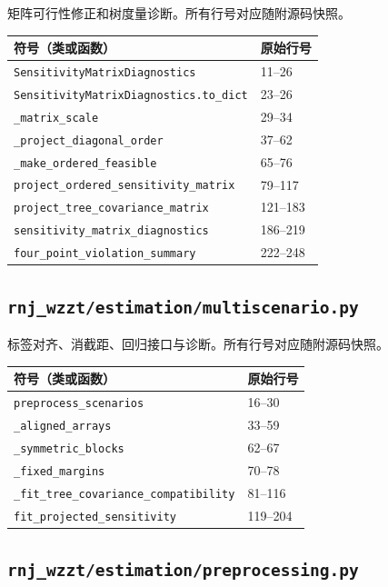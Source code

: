 矩阵可行性修正和树度量诊断。所有行号对应随附源码快照。
\begin{longtable}{P{0.73\textwidth}P{0.18\textwidth}}\toprule 符号（类或函数） & 原始行号\\\midrule\endhead
\nolinkurl{SensitivityMatrixDiagnostics} & 11--26 \\
\nolinkurl{SensitivityMatrixDiagnostics.to_dict} & 23--26 \\
\nolinkurl{_matrix_scale} & 29--34 \\
\nolinkurl{_project_diagonal_order} & 37--62 \\
\nolinkurl{_make_ordered_feasible} & 65--76 \\
\nolinkurl{project_ordered_sensitivity_matrix} & 79--117 \\
\nolinkurl{project_tree_covariance_matrix} & 121--183 \\
\nolinkurl{sensitivity_matrix_diagnostics} & 186--219 \\
\nolinkurl{four_point_violation_summary} & 222--248 \\
\bottomrule\end{longtable}
\subsection{\texorpdfstring{\nolinkurl{rnj_wzzt/estimation/multiscenario.py}}{rnj\_wzzt/estimation/multiscenario.py}}\label{module:estimation.multiscenario}
标签对齐、消截距、回归接口与诊断。所有行号对应随附源码快照。
\begin{longtable}{P{0.73\textwidth}P{0.18\textwidth}}\toprule 符号（类或函数） & 原始行号\\\midrule\endhead
\nolinkurl{preprocess_scenarios} & 16--30 \\
\nolinkurl{_aligned_arrays} & 33--59 \\
\nolinkurl{_symmetric_blocks} & 62--67 \\
\nolinkurl{_fixed_margins} & 70--78 \\
\nolinkurl{_fit_tree_covariance_compatibility} & 81--116 \\
\nolinkurl{fit_projected_sensitivity} & 119--204 \\
\bottomrule\end{longtable}
\subsection{\texorpdfstring{\nolinkurl{rnj_wzzt/estimation/preprocessing.py}}{rnj\_wzzt/estimation/preprocessing.py}}\label{module:estimation.preprocessing}
